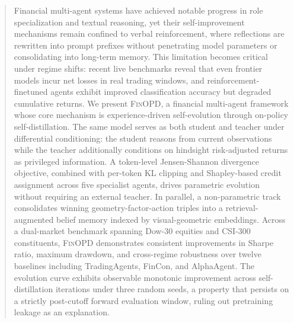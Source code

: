 \begin{abstract}
Financial multi-agent systems have achieved notable progress in role specialization and textual reasoning, yet their self-improvement mechanisms remain confined to verbal reinforcement, where reflections are rewritten into prompt prefixes without penetrating model parameters or consolidating into long-term memory. This limitation becomes critical under regime shifts: recent live benchmarks reveal that even frontier models incur net losses in real trading windows, and reinforcement-finetuned agents exhibit improved classification accuracy but degraded cumulative returns. We present \textsc{FinOPD}, a financial multi-agent framework whose core mechanism is experience-driven self-evolution through on-policy self-distillation. The same model serves as both student and teacher under differential conditioning: the student reasons from current observations while the teacher additionally conditions on hindsight risk-adjusted returns as privileged information. A token-level Jensen-Shannon divergence objective, combined with per-token KL clipping and Shapley-based credit assignment across five specialist agents, drives parametric evolution without requiring an external teacher. In parallel, a non-parametric track consolidates winning geometry-factor-action triples into a retrieval-augmented belief memory indexed by visual-geometric embeddings. Across a dual-market benchmark spanning Dow-30 equities and CSI-300 constituents, \textsc{FinOPD} demonstrates consistent improvements in Sharpe ratio, maximum drawdown, and cross-regime robustness over twelve baselines including TradingAgents, FinCon, and AlphaAgent. The evolution curve exhibits observable monotonic improvement across self-distillation iterations under three random seeds, a property that persists on a strictly post-cutoff forward evaluation window, ruling out pretraining leakage as an explanation.
\end{abstract}
